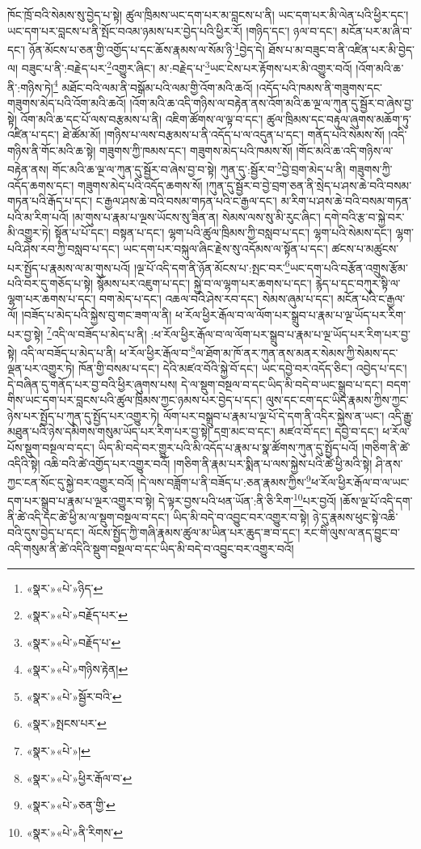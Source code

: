 ཁོང་ཁྲོ་བའི་སེམས་སུ་བྱེད་པ་སྟེ། ཚུལ་ཁྲིམས་ཡང་དག་པར་མ་བླངས་པ་ནི། ཡང་དག་པར་མི་ལེན་པའི་ཕྱིར་དང་། ཡང་དག་པར་བླངས་པ་ནི་སྤོང་བའམ་ཉམས་པར་བྱེད་པའི་ཕྱིར་རོ། །གཉིད་དང་། ཉལ་བ་དང་། མངོན་པར་མ་ཞི་བ་དང་། ཉོན་མོངས་པ་ཅན་གྱི་འགྱོད་པ་དང་ཆོས་རྣམས་ལ་སོམ་ཉི་\footnote{«སྣར་»«པེ་»ཉིད་}བྱེད་དེ། ཐོས་པ་མ་བཟུང་བ་ནི་འཛིན་པར་མི་བྱེད་ལ། བཟུང་པ་ནི་:བརྗེད་པར་\footnote{«སྣར་»«པེ་»བརྗོད་པར་}འགྱུར་ཞིང་། མ་:བརྗེད་པ་\footnote{«སྣར་»«པེ་»བརྗོད་པ་}ཡང་ངེས་པར་རྟོགས་པར་མི་འགྱུར་བའོ། །འོག་མའི་ཆ་ནི་:གཉིས་ཏེ།\footnote{«སྣར་»«པེ་»གཉིས་རྟེན།} མཐོང་བའི་ལམ་ནི་བསྒོམ་པའི་ལམ་གྱི་འོག་མའི་ཆའོ། །འདོད་པའི་ཁམས་ནི་གཟུགས་དང་གཟུགས་མེད་པའི་འོག་མའི་ཆའོ། །འོག་མའི་ཆ་འདི་གཉིས་ལ་བརྟེན་ནས་འོག་མའི་ཆ་ལྔ་ལ་ཀུན་དུ་སྦྱོར་བ་ཞེས་བྱ་སྟེ། འོག་མའི་ཆ་དང་པོ་ལས་བརྩམས་པ་ནི། འཇིག་ཚོགས་ལ་ལྟ་བ་དང་། ཚུལ་ཁྲིམས་དང་བརྟུལ་ཞུགས་མཆོག་ཏུ་འཛིན་པ་དང་། ཐེ་ཚོམ་མོ། །གཉིས་པ་ལས་བརྩམས་པ་ནི་འདོད་པ་ལ་འདུན་པ་དང་། གནོད་པའི་སེམས་སོ། །འདི་གཉིས་ནི་གོང་མའི་ཆ་སྟེ། གཟུགས་ཀྱི་ཁམས་དང་། གཟུགས་མེད་པའི་ཁམས་སོ། །གོང་མའི་ཆ་འདི་གཉིས་ལ་བརྟེན་ནས། གོང་མའི་ཆ་ལྔ་ལ་ཀུན་དུ་སྦྱོར་བ་ཞེས་བྱ་བ་སྟེ། ཀུན་དུ་:སྦྱོར་བ་\footnote{«སྣར་»«པེ་»སྦྱོར་བའི་}བྱེ་བྲག་མེད་པ་ནི། གཟུགས་ཀྱི་འདོད་ཆགས་དང་། གཟུགས་མེད་པའི་འདོད་ཆགས་སོ། །ཀུན་དུ་སྦྱོར་བ་བྱེ་བྲག་ཅན་ནི་སྲེད་པ་ཤས་ཆེ་བའི་བསམ་གཏན་པའི་རྒོད་པ་དང་། ང་རྒྱལ་ཤས་ཆེ་བའི་བསམ་གཏན་པའི་ང་རྒྱལ་དང་། མ་རིག་པ་ཤས་ཆེ་བའི་བསམ་གཏན་པའི་མ་རིག་པའོ། །མ་གུས་པ་རྣམ་པ་ལྔས་ཡོངས་སུ་ཟིན་ན། སེམས་ལས་སུ་མི་རུང་ཞིང་། དགེ་བའི་རྩ་བ་སྐྱེ་བར་མི་འགྱུར་ཏེ། སྟོན་པ་པོ་དང་། བསྟན་པ་དང་། ལྷག་པའི་ཚུལ་ཁྲིམས་ཀྱི་བསླབ་པ་དང་། ལྷག་པའི་སེམས་དང་། ལྷག་པའི་ཤེས་རབ་ཀྱི་བསླབ་པ་དང་། ཡང་དག་པར་བསྐུལ་ཞིང་རྗེས་སུ་འདོམས་ལ་སྟོན་པ་དང་། ཚངས་པ་མཚུངས་པར་སྤྱོད་པ་རྣམས་ལ་མ་གུས་པའོ། །ལྔ་པོ་འདི་དག་ནི་ཉོན་མོངས་པ་:སྤང་བར་\footnote{«སྣར་»སྤངས་པར་}ཡང་དག་པའི་བརྩོན་འགྲུས་རྩོམ་པའི་བར་དུ་གཅོད་པ་སྟེ། སྙོམས་པར་འཇུག་པ་དང་། སྐྱེ་བ་ལ་ལྷག་པར་ཆགས་པ་དང་། རྙེད་པ་དང་བཀུར་སྟི་ལ་ལྷག་པར་ཆགས་པ་དང་། བག་མེད་པ་དང་། འཆལ་བའི་ཤེས་རབ་དང་། སེམས་ཞུམ་པ་དང་། མངོན་པའི་ང་རྒྱལ་ལོ། །བཟོད་པ་མེད་པའི་སྐྱེས་བུ་གང་ཟག་ལ་ནི། ཕ་རོལ་ཕྱིར་རྒོལ་བ་ལ་ལོག་པར་སྒྲུབ་པ་རྣམ་པ་ལྔ་ཡོད་པར་རིག་པར་བྱ་སྟེ། \footnote{«སྣར་»«པེ་»།  }འདི་ལ་བཟོད་པ་མེད་པ་ནི། :ཕ་རོལ་ཕྱིར་རྒོལ་བ་ལ་ལོག་པར་སྒྲུབ་པ་རྣམ་པ་ལྔ་ཡོད་པར་རིག་པར་བྱ་སྟེ། འདི་ལ་བཟོད་པ་མེད་པ་ནི། ཕ་རོལ་ཕྱིར་རྒོལ་བ་\footnote{«སྣར་»«པེ་»ཕྱིར་རྒོལ་བ་}ལ་ཐོག་མ་ཁོ་ནར་ཀུན་ནས་མནར་སེམས་ཀྱི་སེམས་དང་ལྡན་པར་འགྱུར་ཏེ། ཁོན་གྱི་བསམ་པ་དང་། དེའི་མཛའ་བོའི་སྐྱེ་བོ་དང་། ཡང་དབྱེ་བར་འདོད་ཅིང་། འབྱེད་པ་དང་། དེ་བཞིན་དུ་གནོད་པར་བྱ་བའི་ཕྱིར་ཞུགས་པས། དེ་ལ་སྡུག་བསྔལ་བ་དང་ཡིད་མི་བདེ་བ་ཡང་སྒྲུབ་པ་དང་། བདག་གིས་ཡང་དག་པར་བླངས་པའི་ཚུལ་ཁྲིམས་ཀྱང་ཉམས་པར་བྱེད་པ་དང་། ལུས་དང་ངག་དང་ཡིད་རྣམས་ཀྱིས་ཀྱང་ཉེས་པར་སྤྱོད་པ་ཀུན་དུ་སྤྱོད་པར་འགྱུར་ཏེ། ལོག་པར་བསྒྲུབ་པ་རྣམ་པ་ལྔ་པོ་དེ་དག་ནི་འདིར་སྐྱེས་ན་ཡང་། འདི་རྒྱུ་མཐུན་པའི་ཉེས་དམིགས་གསུམ་ཡོད་པར་རིག་པར་བྱ་སྟེ། དགྲ་མང་བ་དང་། མཛའ་བོ་དང་། དབྱེ་བ་དང་། ཕ་རོལ་པོས་སྡུག་བསྔལ་བ་དང་། ཡིད་མི་བདེ་བར་གྱུར་པའི་མི་འདོད་པ་རྣམ་པ་སྣ་ཚོགས་ཀུན་དུ་སྤྱོད་པའོ། །གཅིག་ནི་ཚེ་འདིའི་སྟེ། འཆི་བའི་ཚེ་འགྱོད་པར་འགྱུར་བའོ། །གཅིག་ནི་རྣམ་པར་སྨིན་པ་ལས་སྐྱེས་པའི་ཚེ་ཕྱི་མའི་སྟེ། ཤི་ནས་ཀྱང་ངན་སོང་དུ་སྐྱེ་བར་འགྱུར་བའོ། །དེ་ལས་བཟློག་པ་ནི་བཟོད་པ་:ཅན་རྣམས་ཀྱིས་\footnote{«སྣར་»«པེ་»ཅན་གྱི་}ཕ་རོལ་ཕྱིར་རྒོལ་བ་ལ་ཡང་དག་པར་སྒྲུབ་པ་རྣམ་པ་ལྔར་འགྱུར་བ་སྟེ། དེ་ལྟར་བྱས་པའི་ཕན་ཡོན་:ནི་ཅི་རིག་\footnote{«སྣར་»«པེ་»ནི་རིགས་}པར་བྱའོ། །ཆོས་ལྔ་པོ་འདི་དག་ནི་ཚེ་འདི་དང་ཚེ་ཕྱི་མ་ལ་སྡུག་བསྔལ་བ་དང་། ཡིད་མི་བདེ་བ་འབྱུང་བར་འགྱུར་བ་སྟེ། ཉེ་དུ་རྣམས་ཕུང་སྟེ་འཆི་བའི་དུས་བྱེད་པ་དང་། ལོངས་སྤྱོད་ཀྱི་གཞི་རྣམས་ཚུལ་མ་ཡིན་པར་ཆུད་ཟ་བ་དང་། རང་གི་ལུས་ལ་ནད་བྱུང་བ་འདི་གསུམ་ནི་ཚེ་འདིའི་སྡུག་བསྔལ་བ་དང་ཡིད་མི་བདེ་བ་འབྱུང་བར་འགྱུར་བའོ། 